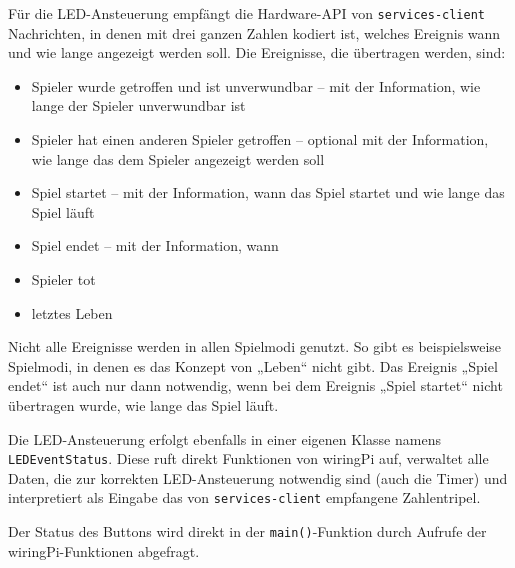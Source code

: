 Für die LED-Ansteuerung empfängt die Hardware-API von \texttt{services-client} Nachrichten, in denen
mit drei ganzen Zahlen kodiert ist, welches Ereignis wann und wie lange angezeigt werden soll.
Die Ereignisse, die übertragen werden, sind:
\begin{itemize}
  \item
    Spieler wurde getroffen und ist unverwundbar – mit der Information, wie lange der Spieler
    unverwundbar ist
  \item
    Spieler hat einen anderen Spieler getroffen – optional mit der Information, wie lange das dem
    Spieler angezeigt werden soll
  \item
    Spiel startet – mit der Information, wann das Spiel startet und wie lange das Spiel läuft
  \item
    Spiel endet – mit der Information, wann
  \item
    Spieler tot
  \item
    letztes Leben
\end{itemize}
Nicht alle Ereignisse werden in allen Spielmodi genutzt.
So gibt es beispielsweise Spielmodi, in denen es das Konzept von „Leben“ nicht gibt.
Das Ereignis „Spiel endet“ ist auch nur dann notwendig, wenn bei dem Ereignis „Spiel startet“ nicht
übertragen wurde, wie lange das Spiel läuft.

Die LED-Ansteuerung erfolgt ebenfalls in einer eigenen Klasse namens \texttt{LEDEventStatus}.
Diese ruft direkt Funktionen von wiringPi auf, verwaltet alle Daten, die zur korrekten
LED-Ansteuerung notwendig sind (auch die Timer) und interpretiert als Eingabe das von
\texttt{services-client} empfangene Zahlentripel.

Der Status des Buttons wird direkt in der \texttt{main()}-Funktion durch Aufrufe der
wiringPi-Funktionen abgefragt.

